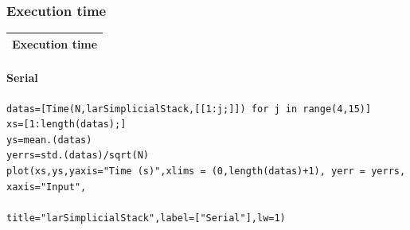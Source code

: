 \documentclass{article}
\begin{document}
\subsubsection{Execution time}
\begin{center}
\begin{tabular}{|p{16cm}|}
\hline
\cellcolor[gray]{.9}Execution time\\
\hline
\end{tabular}
\end{center}



\paragraph{Serial}
\begin{flushleft}\small
\begin{list}{}{} \item
    \begin{Verbatim}[tabsize=4]
datas=[Time(N,larSimplicialStack,[[1:j;]]) for j in range(4,15)]
xs=[1:length(datas);]
ys=mean.(datas)
yerrs=std.(datas)/sqrt(N)
plot(xs,ys,yaxis="Time (s)",xlims = (0,length(datas)+1), yerr = yerrs, xaxis="Input",
                                            title="larSimplicialStack",label=["Serial"],lw=1)
    \end{Verbatim}
\end{list}
\end{flushleft} 
\end{document}
